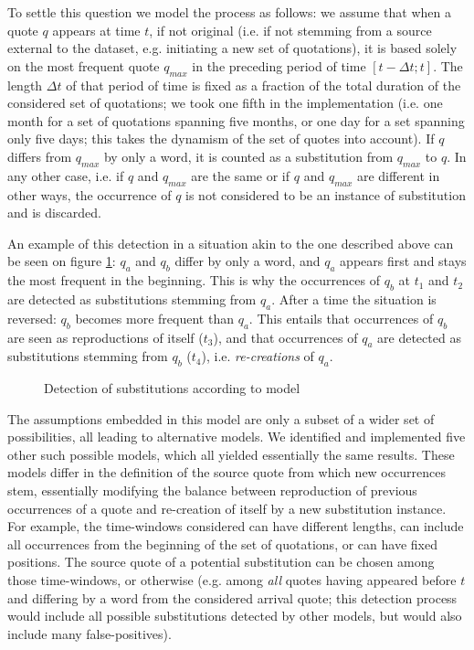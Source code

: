 To settle this question we model the process as follows: we assume that when a quote $q$ appears at time $t$, if not original (i.e. if not stemming from a source external to the dataset, e.g. initiating a new set of quotations), it is based solely on the most frequent quote $q_{max}$ in the preceding period of time $[t - \Delta t ; t]$. The length $\Delta t$ of that period of time is fixed as a fraction of the total duration of the considered set of quotations; we took one fifth in the implementation (i.e. one month for a set of quotations spanning five months, or one day for a set spanning only five days; this takes the dynamism of the set of quotes into account). If $q$ differs from $q_{max}$ by only a word, it is counted as a substitution from $q_{max}$ to $q$. In any other case, i.e. if $q$ and $q_{max}$ are the same or if $q$ and $q_{max}$ are different in other ways, the occurrence of $q$ is not considered to be an instance of substitution and is discarded.

An example of this detection in a situation akin to the one described above can be seen on figure \ref{fig:model-slidetimebags}: $q_a$ and $q_b$ differ by only a word, and $q_a$ appears first and stays the most frequent in the beginning. This is why the occurrences of $q_b$ at $t_1$ and $t_2$ are detected as substitutions stemming from $q_a$. After a time the situation is reversed: $q_b$ becomes more frequent than $q_a$. This entails that occurrences of $q_b$ are seen as reproductions of itself ($t_3$), and that occurrences of $q_a$ are detected as substitutions stemming from $q_b$ ($t_4$), i.e. \emph{re-creations} of $q_a$.

\begin{figure}[h]
	\centering
	\def\svgwidth{\textwidth}
	\small
	
	\caption{Detection of substitutions according to model }
	\label{fig:model-slidetimebags}
\end{figure}

The assumptions embedded in this model are only a subset of a wider set of possibilities, all leading to alternative models. We identified and implemented five other such possible models, which all yielded essentially the same results. These models differ in the definition of the source quote from which new occurrences stem, essentially modifying the balance between reproduction of previous occurrences of a quote and re-creation of itself by a new substitution instance. For example, the time-windows considered can have different lengths, can include all occurrences from the beginning of the set of quotations, or can have fixed positions. The source quote of a potential substitution can be chosen among those time-windows, or otherwise (e.g. among \emph{all} quotes having appeared before $t$ and differing by a word from the considered arrival quote; this detection process would include all possible substitutions detected by other models, but would also include many false-positives).


